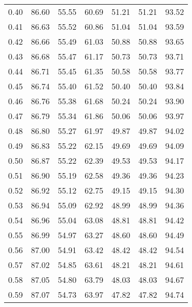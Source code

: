 \begin{tabular}{|c|c|c|c|c|c|c|}
      0.40 &     86.60 &     55.55 &      60.69 &   51.21 &      51.21 &         93.52 \\
      0.41 &     86.63 &     55.52 &      60.86 &   51.04 &      51.04 &         93.59 \\
      0.42 &     86.66 &     55.49 &      61.03 &   50.88 &      50.88 &         93.65 \\
      0.43 &     86.68 &     55.47 &      61.17 &   50.73 &      50.73 &         93.71 \\
      0.44 &     86.71 &     55.45 &      61.35 &   50.58 &      50.58 &         93.77 \\
      0.45 &     86.74 &     55.40 &      61.52 &   50.40 &      50.40 &         93.84 \\
      0.46 &     86.76 &     55.38 &      61.68 &   50.24 &      50.24 &         93.90 \\
      0.47 &     86.79 &     55.34 &      61.86 &   50.06 &      50.06 &         93.97 \\
      0.48 &     86.80 &     55.27 &      61.97 &   49.87 &      49.87 &         94.02 \\
      0.49 &     86.83 &     55.22 &      62.15 &   49.69 &      49.69 &         94.09 \\
      0.50 &     86.87 &     55.22 &      62.39 &   49.53 &      49.53 &         94.17 \\
      0.51 &     86.90 &     55.19 &      62.58 &   49.36 &      49.36 &         94.23 \\
      0.52 &     86.92 &     55.12 &      62.75 &   49.15 &      49.15 &         94.30 \\
      0.53 &     86.94 &     55.09 &      62.92 &   48.99 &      48.99 &         94.36 \\
      0.54 &     86.96 &     55.04 &      63.08 &   48.81 &      48.81 &         94.42 \\
      0.55 &     86.99 &     54.97 &      63.27 &   48.60 &      48.60 &         94.49 \\
      0.56 &     87.00 &     54.91 &      63.42 &   48.42 &      48.42 &         94.54 \\
      0.57 &     87.02 &     54.85 &      63.61 &   48.21 &      48.21 &         94.61 \\
      0.58 &     87.05 &     54.80 &      63.79 &   48.03 &      48.03 &         94.67 \\
      0.59 &     87.07 &     54.73 &      63.97 &   47.82 &      47.82 &         94.74 \\

\end{tabular}
